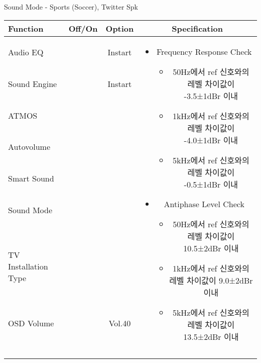 \begin{frame}[t]{Sound Mode - Sports (Soccer), Twitter Spk}
\begin{tiny}
\begin{tabular}{@{}lccc@{}}
\toprule
Function & Off/On & Option & Specification \\
\midrule
Audio EQ & \color{black}{Off} & Instart &
\multirow{10}{60mm}{
\begin{itemize}
\item Frequency Response Check
	\begin{itemize}
	\item 50Hz에서 ref 신호와의 레벨 차이값이 -3.5±1dBr 이내
	\item 1kHz에서 ref 신호와의 레벨 차이값이 -4.0±1dBr 이내
	\item 5kHz에서 ref 신호와의 레벨 차이값이 -0.5±1dBr 이내
	\end{itemize}
\item Antiphase Level Check
	\begin{itemize}
	\item 50Hz에서 ref 신호와의 레벨 차이값이 10.5±2dBr 이내
	\item 1kHz에서 ref 신호와의 레벨 차이값이 9.0±2dBr 이내
	\item 5kHz에서 ref 신호와의 레벨 차이값이 13.5±2dBr 이내
	\end{itemize}
\end{itemize}
} \\
Sound Engine & \color{blue}{On} & Instart & \\
ATMOS & \color{black}{Off}  & & \\
Autovolume & \color{black}{Off} & & \\
Smart Sound & \color{black}{Off} & & \\
Sound Mode & \color{blue}{On} & \color{blue}{Sports} & \\
TV Installation Type & \color{blue}{On} & \color{black}{Standtype1} & \\
OSD Volume & \color{blue}{On} & Vol.40 & \\
& & & \\
& & & \\
& & & \\
& & & \\
\midrule
\end{tabular}
\end{tiny}


\end{frame}